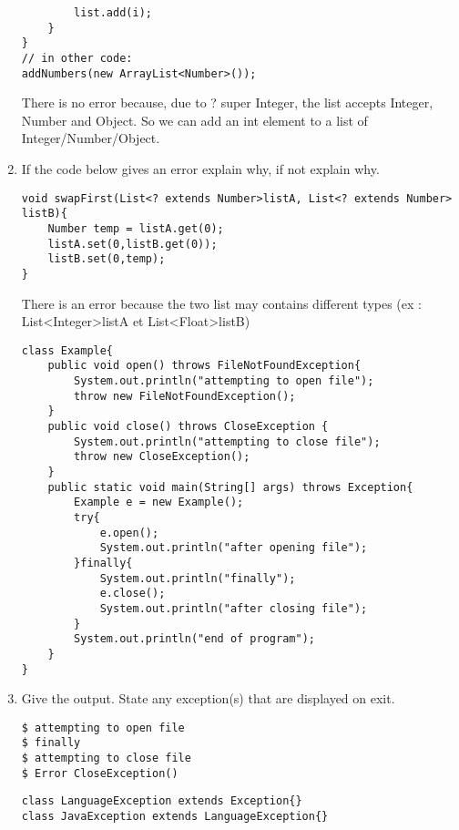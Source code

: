 \documentclass{article}
\begin{document}
\begin{enumerate}
\begin{lstlisting}
		list.add(i);
	}
}
// in other code:
addNumbers(new ArrayList<Number>());
\end{lstlisting}
	\noindent There is no error because, due to ? super Integer, the list accepts Integer, Number and Object. So we can add an int element to a list of Integer/Number/Object.
	\item If the code below gives an error explain why, if not explain why.\newline
\begin{lstlisting}
void swapFirst(List<? extends Number>listA, List<? extends Number> listB){
	Number temp = listA.get(0);
 	listA.set(0,listB.get(0));
	listB.set(0,temp);
}
\end{lstlisting}
\noindent There is an error because the two list may contains different types (ex : List\textless Integer\textgreater listA et List\textless Float\textgreater listB)
\begin{lstlisting}
class Example{
 	public void open() throws FileNotFoundException{
  		System.out.println("attempting to open file");
  		throw new FileNotFoundException();
 	}
 	public void close() throws CloseException {
  		System.out.println("attempting to close file");
  		throw new CloseException();
 	}
 	public static void main(String[] args) throws Exception{
  		Example e = new Example();
  		try{ 
   			e.open();
   			System.out.println("after opening file");
  		}finally{ 
   			System.out.println("finally");
   			e.close();
   			System.out.println("after closing file");
  		}
  		System.out.println("end of program");
	}
}
\end{lstlisting}
	\item Give the output. State any exception(s) that are displayed on exit.
\begin{lstlisting}
$ attempting to open file
$ finally
$ attempting to close file
$ Error CloseException()
\end{lstlisting}
	\newpage
\begin{lstlisting}
class LanguageException extends Exception{}
class JavaException extends LanguageException{}


\end{lstlisting}
\end{enumerate}
\end{document}
